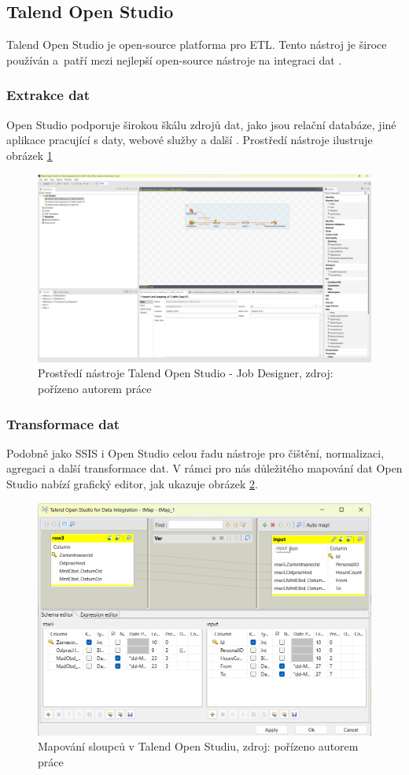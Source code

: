 \subsection{Talend Open Studio}

Talend Open Studio je open-source platforma pro ETL. Tento nástroj je široce používán a~patří mezi nejlepší open-source nástroje na integraci dat \cite{TalendReview:online}.

\subsubsection{Extrakce dat}
Open Studio podporuje širokou škálu zdrojů dat, jako jsou relační databáze, jiné aplikace pracující s daty, webové služby a další \cite{TalendSupportedSources:online}. Prostředí nástroje ilustruje obrázek \ref{fig:TalendJobDesigner}

\begin{figure}
    \centering
    \includegraphics[width=0.75\linewidth]{img/Talend prostředí.png}
    \caption{Prostředí nástroje Talend Open Studio - Job Designer, zdroj: pořízeno autorem práce}
    \label{fig:TalendJobDesigner}
\end{figure}

\subsubsection{Transformace dat}
Podobně jako SSIS i Open Studio celou řadu nástroje pro čištění, normalizaci, agregaci a další transformace dat.
V rámci pro nás důležitého mapování dat Open Studio nabízí grafický editor, jak ukazuje obrázek \ref{fig:TalendColumnMapping}.

\begin{figure}
    \centering
    \includegraphics[width=0.6\linewidth]{img/Talend Column mapping.png}
    \caption{Mapování sloupců v Talend Open Studiu, zdroj: pořízeno autorem práce}
    \label{fig:TalendColumnMapping}
\end{figure}

